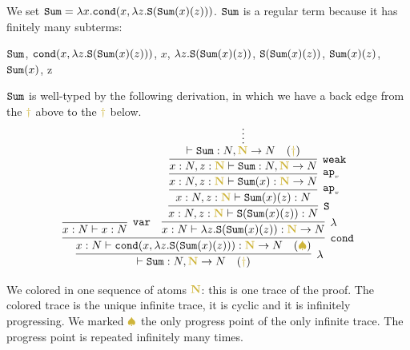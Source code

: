 \begin{Eg}
\label{example-sum}
We set ${\tt Sum} = \lambda x.{\tt cond}(x,\lambda z.{\tt S}({\tt Sum}(x)(z)))$.
${\tt Sum}$ is a regular term because it has finitely many subterms: 
\begin{center}
  ${\tt Sum}$,
  \quad
  ${\tt cond}(x,\lambda z.{\tt S}({\tt Sum}(x)(z)))$,
  \quad
  $x$,
  \quad
  $\lambda z.{\tt S}({\tt Sum}(x)(z))$,
 \quad
  ${\tt S}({\tt Sum}(x)(z))$,
  \quad
  ${\tt Sum}(x)(z)$,
  \quad
  ${\tt Sum}(x)$,
  \quad
   z
\end{center}
${\tt Sum}$ is well-typed by the following derivation, in which we have a back edge from the 
$\bfColor{oldgold}{\dagger}$ above to the $\bfColor{oldgold}{\dagger}$ below.
\[
\infer[\lambda]{
  \vdash \Sum:\N, \bfColor{oldgold}{\N} \rightarrow \N 
   \quad (\bfColor{oldgold}{\dagger})
}{
  \infer[\cond]{
    x : \N \vdash 
    \cond(x,\lambda z.\Succ(\Sum(x)(z))): \bfColor{oldgold}{\N} \rightarrow \N
     \quad (\bfColor{oldgold}{ \spadesuit})
  }{
    \infer[\var]{
      x : \N \vdash x : \N
    }{}
    &
    \infer[\lambda]{
      x:\N \vdash \lambda z.\Succ(\Sum(x)(z)): \bfColor{oldgold}{\N} \rightarrow \N  
    }{
      \infer[\Succ]{
        x:\N, z : \bfColor{oldgold}{\N} 
        \vdash \Succ(\Sum(x)(z)): \N  
      }{
        \infer[\apvar]{
          x:\N, z : \bfColor{oldgold}{\N} 
          \vdash \Sum(x)(z): \N
        }{
          \infer[\apvar]{
            x:\N,  z : \bfColor{oldgold}{\N}
            \vdash \Sum(x): \bfColor{oldgold}{\N} \rightarrow \N
          }{
            \infer[\weak]{
              x:\N,  z : \bfColor{oldgold}{\N}
              \vdash \Sum: \N, \bfColor{oldgold}{\N} \rightarrow  \N
            }{
              \infer*{\vdash \Sum: \N, \bfColor{oldgold}{\N} \rightarrow \N 
                \quad (\bfColor{oldgold}{\dagger})}{}
            }
          }
        }
      }
    }
  }
}
\]
\end{Eg}

We colored in  one sequence of atoms $\bfColor{oldgold}{\N}$:
this is one trace of the proof.
The colored trace is the unique infinite trace, it is cyclic and it is infinitely progressing.
We marked $\bfColor{oldgold}{ \spadesuit}$ the only progress point of the only infinite trace.
The progress point is repeated infinitely many times.


%


